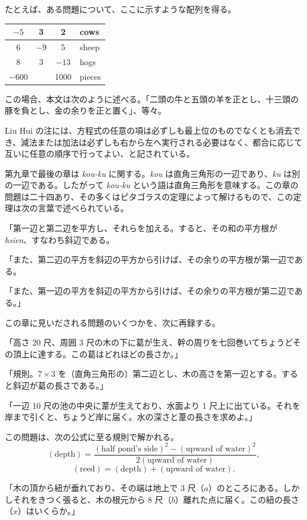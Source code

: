 \documentclass[11pt]{article}
\newcommand{\scanpage}[2]{\clearpage\setcounter{footnote}{0}\noindent{\footnotesize\color{gray}PDF #1 頁 · #2}\par\medskip}
\newcommand{\scanfooter}{}
\newcommand{\fangtableF}{\begin{tabular}{|c|c|c|l|}\hline $-5$&3&2&cows\\\hline 6&$-9$&5&sheep\\\hline 8&3&$-13$&hogs\\\hline $-600$&&1000&pieces\\\hline\end{tabular}}
\begin{document}
\begin{center}
\begin{minipage}{0.28\linewidth}
\raggedright
たとえば、ある問題について、ここに示すような配列を得る。
\end{minipage}\hfill
\begin{minipage}{0.66\linewidth}
\centering\fangtableF
\end{minipage}
\end{center}

この場合、本文は次のように述べる。「二頭の牛と五頭の羊を正とし、十三頭の豚を負とし、金の余りを正と置く」、等々。

Liu Hui の注には、方程式の任意の項は必ずしも最上位のものでなくとも消去でき、減法または加法は必ずしも右から左へ実行される必要はなく、都合に応じて互いに任意の順序で行ってよい、と記されている。

第九章で最後の章は \emph{kou-ku} に関する。\emph{kou} は直角三角形の一辺であり、\emph{ku} は別の一辺である。したがって \emph{kou-ku} という語は直角三角形を意味する。この章の問題は二十四あり、その多くはピタゴラスの定理によって解けるもので、この定理は次の言葉で述べられている。

「第一辺と第二辺を平方し、それらを加える。すると、その和の平方根が \emph{hsien}、すなわち斜辺である。

「また、第二辺の平方を斜辺の平方から引けば、その余りの平方根が第一辺である。

「また、第一辺の平方を斜辺の平方から引けば、その余りの平方根が第二辺である。」
\scanfooter

\scanpage{0036}{第三章、印刷頁22}
この章に見いだされる問題のいくつかを、次に再録する。

「高さ 20 尺、周囲 3 尺の木の下に葛が生え、幹の周りを七回巻いてちょうどその頂上に達する。この葛はどれほどの長さか。」

「規則。$7\times3$ を（直角三角形の）第二辺とし、木の高さを第一辺とする。すると斜辺が葛の長さである。」

「一辺 10 尺の池の中央に葦が生えており、水面より 1 尺上に出ている。それを岸まで引くと、ちょうど岸に届く。水の深さと葦の長さを求めよ。」

この問題は、次の公式に至る規則で解かれる。
\[
(\text{depth})=\frac{(\text{half pond's side})^2-(\text{upward of water})^2}{2(\text{upward of water})},
\]
\[
(\text{reed})=(\text{depth})+(\text{upward of water}).
\]

「木の頂から紐が垂れており、その端は地上で 3 尺（$a$）のところにある。しかしそれをきつく張ると、木の根元から 8 尺（$b$）離れた点に届く。この紐の長さ（$x$）はいくらか。」
\end{document}
